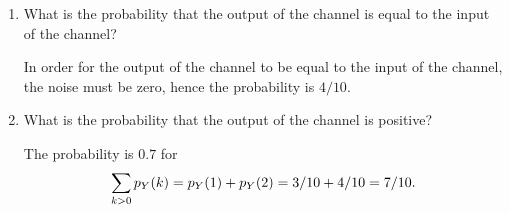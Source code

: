 \begin{enumerate}
\begin{enumerate}
		\item What is the probability that the output of the channel
		is equal to the input of the channel?
		\ifdefined\sol
		\begin{solution}
			In order for the output of the channel to be equal to the input of the channel,
			the noise must be zero,
			hence the probability is $4/10$.
		\end{solution}
		\fi

		\item What is the probability that the output of the channel is positive?
		\ifdefined\sol
		\begin{solution}
			The probability is $0.7$ for
			\[
				\sum_{k>0} p_{Y}(k)
				= p_{Y}(1) + p_{Y}(2)
				= 3/10 + 4/10 = 7/10.
			\]
		\end{solution}
		\fi

	\end{enumerate}


\end{enumerate}





